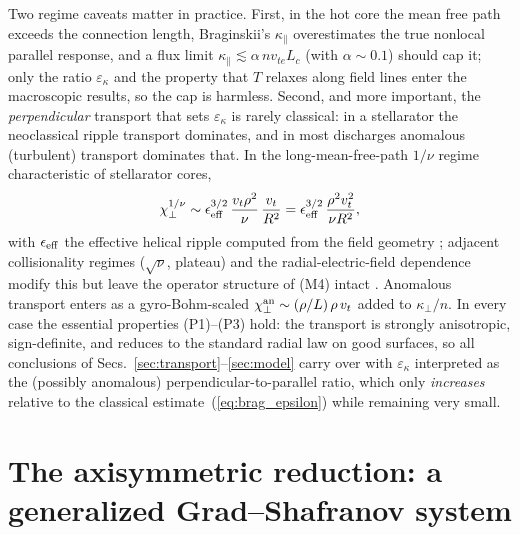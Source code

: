 \documentclass[english]{article}
\begin{document}
Two regime caveats matter in practice. First, in the hot core the mean free path exceeds the
connection length, Braginskii's $\kappa_\parallel$ overestimates the true nonlocal parallel
response, and a flux limit $\kappa_\parallel\lesssim\alpha\,n v_{te}L_c$ (with $\alpha\sim0.1$)
should cap it; only the ratio $\varepsilon_\kappa$ and the property that $T$ relaxes along field
lines enter the macroscopic results, so the cap is harmless. Second, and more important, the
\emph{perpendicular} transport that sets $\varepsilon_\kappa$ is rarely classical: in a stellarator
the neoclassical ripple transport dominates, and in most discharges anomalous (turbulent) transport
dominates that. In the long-mean-free-path $1/\nu$ regime characteristic of stellarator cores,
\begin{equation}
\chi_\perp^{1/\nu}\sim\epsilon_{\rm eff}^{3/2}\,\frac{v_{t}\rho^{2}}{\nu}\,\frac{v_t}{R^{2}}
=\epsilon_{\rm eff}^{3/2}\,\frac{\rho^{2}v_t^{2}}{\nu R^{2}} ,
\label{eq:chi_neoclassical}
\end{equation}
with $\epsilon_{\rm eff}$ the effective helical ripple computed from the field geometry
\cite{nemov1999}; adjacent collisionality regimes ($\sqrt\nu$, plateau) and the radial-electric-field
dependence modify this but leave the operator structure of (M4) intact
\cite{helander_sigmar,helander_simakov2008}. Anomalous transport enters as a gyro-Bohm-scaled
$\chi_\perp^{\rm an}\sim(\rho/L)\,\rho\,v_t$ added to $\kappa_\perp/n$. In every case the essential
properties (P1)--(P3) hold: the transport is strongly anisotropic, sign-definite, and reduces to the
standard radial law on good surfaces, so all conclusions of Secs.~\ref{sec:transport}--\ref{sec:model}
carry over with $\varepsilon_\kappa$ interpreted as the (possibly anomalous) perpendicular-to-parallel
ratio, which only \emph{increases} relative to the classical estimate~(\ref{eq:brag_epsilon}) while
remaining very small.

\section{The axisymmetric reduction: a generalized Grad--Shafranov system}
\label{sec:axisym}
\end{document}
